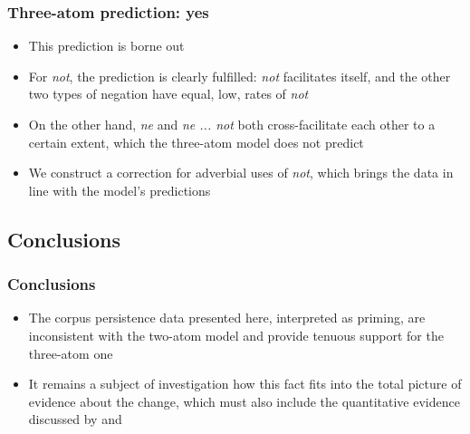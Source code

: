 \documentclass{digs-slides}
\newcommand{\includegraph}[1]{\mode<beamer>{}
    \mode<handout>{}}
\begin{document}
\begin{frame}
    \frametitle{Three-atom prediction: yes}
    \begin{overprint}
        \begin{itemize}
          \item This prediction is borne out
        \end{itemize}
        \begin{itemize}
          \item For \emph{not}, the prediction is clearly fulfilled:
            \emph{not} facilitates itself, and the other two types of
            negation have equal, low, rates of \emph{not}
        \end{itemize}
        \begin{itemize}
          \item On the other hand, \emph{ne} and \emph{ne ... not} both
            cross-facilitate each other to a certain extent, which the
            three-atom model does not predict
        \end{itemize}
        \begin{itemize}
          \item We construct a correction for adverbial uses of
            \emph{not}, which brings the data in line with the model’s
            predictions
        \end{itemize}
    \end{overprint}


    \begin{overprint}
        \includegraph{figures/patch}
    \end{overprint}
\end{frame}

\subsection{Conclusions}
\label{sec:conclusions}

\begin{frame}
    \frametitle{Conclusions}
    \begin{itemize}
      \item The corpus persistence data presented here, interpreted as
        priming, are inconsistent with the two-atom model and provide
        tenuous support for the three-atom one

      \item It remains a subject of investigation how this fact fits
        into the total picture of evidence about the change, which must
        also include the quantitative evidence discussed by
        \textcite{Frisch1997} and \textcite{wallage08}
    \end{itemize}
\end{frame}
\end{document}
